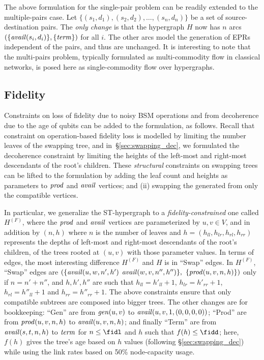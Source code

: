The above \LP formulation for the single-pair \qnr problem can be 
readily extended to the multiple-pairs case.
Let $\{(s_1, d_1), (s_2, d_2), \ldots, (s_n,d_n)\}$ be a set of
source-destination pairs. The \emph{only change} is
that the hypergraph $H$ now has $n$ arcs $(\{\mathit{avail}(s_i,d_i)\},
\{\mathit{term}\})$ for all $i$.  The other arcs model the generation of EPRs 
independent of the pairs, and thus are unchanged. 
It is interesting to note that the multi-pairs problem, 
typically formulated as multi-commodity flow in classical networks, 
is posed here as single-commodity flow over hypergraphs.

\subsection{Fidelity}

Constraints on loss of fidelity due to noisy BSM operations
and from decoherence due to the age of qubits can be added to the
\LP formulation, as follows.  
Recall that constraint on operation-based fidelity loss is modelled
by limiting the number leaves of the swapping tree, and in~\S\ref{sec:swapping_dec}, 
we formulated the decoherence constraint by limiting the
heights of the left-most and right-most descendants  of the root's
children. These
\emph{structural} constraints on swapping trees can be lifted to the
\LP formulation by adding the leaf count and heights as
parameters to $\mathit{prod}$ and $\mathit{avail}$ vertices; and (ii) swapping
the \epss generated from only the compatible vertices.  

In particular, we generalize the ST-hypergraph to a
\emph{fidelity-constrained} one called $H^{(F)}$, where the
$\mathit{prod}$ and $\mathit{avail}$ vertices are parameterized by $u,v \in
V$, and in addition by $(n,h)$ where $n$ is the number of leaves 
and $h=(h_{ll}, h_{lr}, h_{rl}, h_{rr})$ represents the depths of left-most 
and right-most descendants of the root's children, of the
trees rooted at $(u,v)$ with those parameter values.
In terms of edges, the most interesting difference $H^{(F)}$
and $H$ is in ``Swap'' edges.   In 
$H^{(F)}$, ``Swap'' edges are 
$( \{\mathit{avail}(u,w,n',h') $
$\mathit{avail}(w,v,n'',h'')\}, $
$\{\mathit{prod}(u,v,n,h)\})$ only if
$n = n'+n''$, and $h,h',h''$ are such that
$h_{ll} = h'_{ll}+1$, $h_{lr} = h'_{rr}+1$, $h_{rl}
= h''_{ll}+1$ and $h_{rr} = h''_{rr}+1$.  
The above constraints ensure that only compatible subtrees are
composed into bigger trees. The other changes are for bookkeeping: 
``Gen'' are from $\mathit{gen}(u,v)$ to $\mathit{avail}(u,v,1,(0,0,0,0))$; 
``Prod''  are from $\mathit{prod}(u,v,n,h)$ to
$\mathit{avail}(u,v,n,h)$; and finally ``Term''
are from $\mathit{avail}(s,t,n,h)$ to
$\mathit{term}$ for $n \leq \fidl$ and $h$ such that 
$f(h) \leq \fidd$; here, $f(h)$ gives the tree's age based on $h$ 
values (following \S\ref{sec:swapping_dec}) 
while using the link rates based on 50\% node-capacity 
usage.

